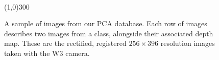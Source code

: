 \begin{figure}[h]
 \\

\begin{center}
\line(1,0){300}
\end{center}

 \caption[A sample of our PCA database]{A sample of images from our PCA database. Each row of images
describes two images from a class, alongside their associated depth map. These are the rectified,
registered $256\times396$ resolution images taken with the W3 camera.}
 \label{fig:classdb}
\end{figure}




